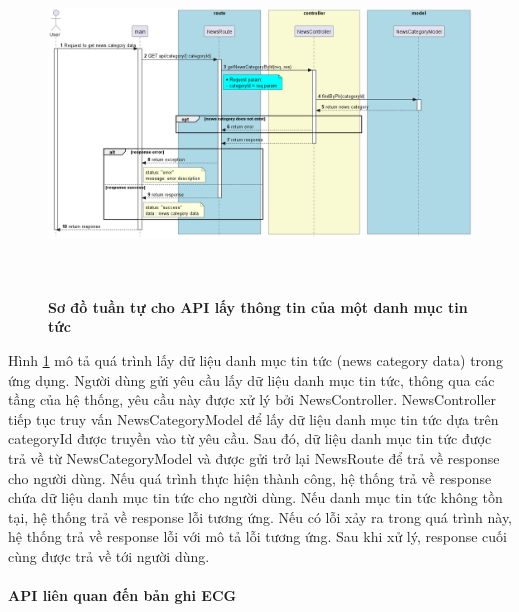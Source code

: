 \begin{figure}[H]
  \centering
  \includegraphics[width=16cm,height=9cm]{Images/server/sequence/server/getNewsCategoryById.png}
  \caption[Sơ đồ tuần tự cho API lấy thông tin của một danh mục tin tức ]{\bfseries \fontsize{12pt}{0pt}
  \selectfont Sơ đồ tuần tự cho API lấy thông tin của một danh mục tin tức }
  \label{getNewsCategoryById} %
\end{figure}
Hình \ref{getNewsCategoryById} mô tả quá trình lấy dữ liệu danh mục tin tức (news category data) trong ứng dụng. Người dùng gửi yêu cầu lấy dữ liệu danh mục tin tức, thông qua các tầng của hệ thống, yêu cầu này được xử lý bởi NewsController. NewsController tiếp tục truy vấn NewsCategoryModel để lấy dữ liệu danh mục tin tức dựa trên categoryId được truyền vào từ yêu cầu. Sau đó, dữ liệu danh mục tin tức được trả về từ NewsCategoryModel và được gửi trở lại NewsRoute để trả về response cho người dùng. Nếu quá trình thực hiện thành công, hệ thống trả về response chứa dữ liệu danh mục tin tức cho người dùng. Nếu danh mục tin tức không tồn tại, hệ thống trả về response lỗi tương ứng. Nếu có lỗi xảy ra trong quá trình này, hệ thống trả về response lỗi với mô tả lỗi tương ứng. Sau khi xử lý, response cuối cùng được trả về tới người dùng.



\paragraph{API liên quan đến bản ghi ECG}
\mbox{}



